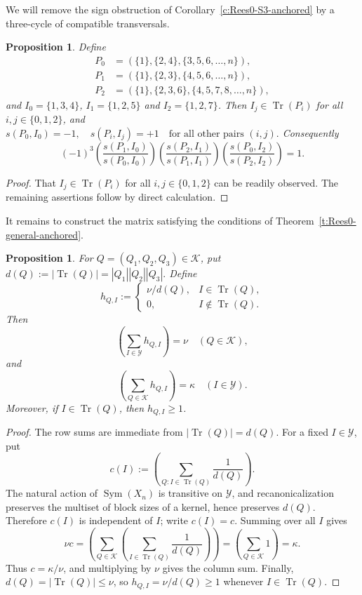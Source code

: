 \documentclass[11pt]{article}
\theoremstyle{plain}
\newtheorem{prop}[theorem]{Proposition}
\theoremstyle{remark}
\theoremstyle{definition}
\theoremstyle{plain}
\newcommand{\Sym}{\mathop{\mathrm{Sym}}}
\DeclareMathOperator{\Tr}{Tr}
\begin{document}
We will remove the sign obstruction of Corollary~\ref{c:Rees0-S3-anchored} by a three-cycle of compatible transversals.

\begin{prop}\label{t3:prop:positive-three-cycle}
Define
\[
\begin{aligned}
P_0&=(\{1\},\{2,4\},\{3,5,6,\ldots,n\}),\\
P_1&=(\{1\},\{2,3\},\{4,5,6,\ldots,n\}),\\
P_2&=(\{1\},\{2,3,6\},\{4,5,7,8,\ldots,n\}),
\end{aligned}
\]
and \(I_0=\{1,3,4\}\), \(I_1=\{1,2,5\}\) and
\(I_2=\{1,2,7\}\).
Then $I_j\in\Tr(P_i)$ for all $i,j\in\{0,1,2\}$, and
\(s(P_0,I_0)=-1,\quad s(P_i,I_j)=+1\quad\text{for all other pairs }(i,j).\)
Consequently
\[
        (-1)^3
        \left(
        \frac{s(P_1,I_0)}{s(P_0,I_0)}
        \right)
        \left(
        \frac{s(P_2,I_1)}{s(P_1,I_1)}
        \right)
        \left(
        \frac{s(P_0,I_2)}{s(P_2,I_2)}
        \right)=1.
\]
\end{prop}

\begin{proof} That $I_j\in\Tr(P_i)$ for all $i,j\in\{0,1,2\}$ can be readily observed. The remaining assertions follow by direct calculation.
\end{proof}
It remains to construct the matrix satisfying the conditions of Theorem~\ref{t:Rees0-general-anchored}.

\begin{prop}\label{t3:prop:harmonic}
For $Q=(Q_1,Q_2,Q_3)\in\mathcal K$, put
\(d(Q):=|\Tr(Q)|=|Q_1||Q_2||Q_3|.\)
Define
\[
        h_{Q,I}:=
        \begin{cases}
        \nu/d(Q), & I\in\Tr(Q),\\
        0, & I\notin\Tr(Q).
        \end{cases}
\]
Then
\[
\left(\sum_{I\in\mathcal Y}h_{Q,I}\right)=\nu\quad(Q\in\mathcal K),
\]
and
\[
\left(\sum_{Q\in\mathcal K}h_{Q,I}\right)=\kappa\quad(I\in\mathcal Y).
\]
Moreover, if $I\in\Tr(Q)$, then $h_{Q,I}\ge1$.
\end{prop}

\begin{proof}
The row sums are immediate from $|\Tr(Q)|=d(Q)$. For a fixed $I\in\mathcal Y$, put
\[
        c(I):=\left(\sum_{Q:I\in\Tr(Q)}\frac1{d(Q)}\right).
\]
The natural action of $\Sym(X_n)$ is transitive on $\mathcal Y$, and
recanonicalization preserves the multiset of block sizes of a kernel, hence
preserves $d(Q)$. Therefore $c(I)$ is independent of $I$; write $c(I)=c$.
Summing over all $I$ gives
\[
        \nu c=
        \left(\sum_{Q\in\mathcal K}\left(\sum_{I\in\Tr(Q)}\frac1{d(Q)}\right)\right)
        =\left(\sum_{Q\in\mathcal K}1\right)=\kappa.
\]
Thus $c=\kappa/\nu$, and multiplying by $\nu$ gives the column sum. Finally,
$d(Q)=|\Tr(Q)|\le\nu$, so $h_{Q,I}=\nu/d(Q)\ge1$ whenever $I\in\Tr(Q)$.
\end{proof}
\end{document}
